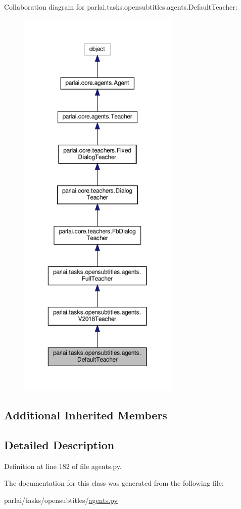 Collaboration diagram for parlai.\+tasks.\+opensubtitles.\+agents.\+Default\+Teacher\+:
\nopagebreak
\begin{figure}[H]
\begin{center}
\leavevmode
\includegraphics[height=550pt]{classparlai_1_1tasks_1_1opensubtitles_1_1agents_1_1DefaultTeacher__coll__graph}
\end{center}
\end{figure}
\subsection*{Additional Inherited Members}


\subsection{Detailed Description}


Definition at line 182 of file agents.\+py.



The documentation for this class was generated from the following file\+:\begin{DoxyCompactItemize}
\item 
parlai/tasks/opensubtitles/\hyperlink{parlai_2tasks_2opensubtitles_2agents_8py}{agents.\+py}\end{DoxyCompactItemize}
